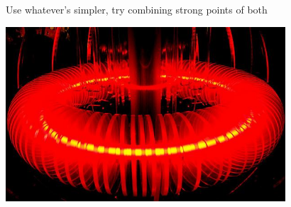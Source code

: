 \documentclass{beamer}
\begin{document}
\begin{frame}[fragile]{Use whatever's simpler, try combining strong points of both}
  \begin{center}
    \includegraphics[height=6.5cm]{img/fusion.jpg}
  \end{center}
\end{frame}

\end{document}
